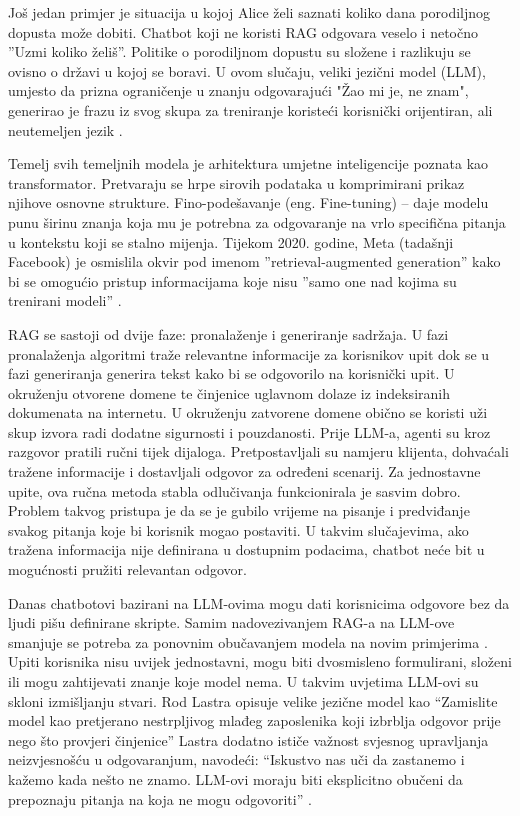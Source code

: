 \documentclass[]{foi}
\begin{document}
Još jedan primjer je situacija u kojoj Alice želi saznati koliko dana porodiljnog dopusta može dobiti. Chatbot koji ne koristi RAG odgovara veselo i netočno ”Uzmi koliko želiš”.
Politike o porodiljnom dopustu su složene i razlikuju se ovisno o državi u kojoj se boravi. U ovom slučaju, veliki jezični model (LLM), umjesto da prizna ograničenje u znanju odgovarajući
"Žao mi je, ne znam", generirao je frazu iz svog skupa za treniranje koristeći korisnički orijentiran, ali neutemeljen jezik \cite{ibmRAG}.

Temelj svih temeljnih modela je arhitektura umjetne inteligencije poznata kao transformator. Pretvaraju se hrpe sirovih podataka u komprimirani prikaz njihove osnovne strukture. 
Fino-podešavanje (eng. Fine-tuning) – daje modelu punu širinu znanja koja mu je potrebna za odgovaranje na vrlo specifična pitanja u kontekstu koji se stalno mijenja. Tijekom 2020. godine, 
Meta (tadašnji Facebook) je osmislila okvir pod imenom ”retrieval-augmented generation” kako bi se omogućio pristup informacijama koje nisu ”samo one nad kojima su trenirani modeli” \cite{ibmRAG}.

RAG se sastoji od dvije faze: pronalaženje i generiranje sadržaja. U fazi pronalaženja algoritmi traže relevantne informacije za korisnikov upit dok se u fazi generiranja generira tekst 
kako bi se odgovorilo na korisnički upit. U okruženju otvorene domene te činjenice uglavnom dolaze iz indeksiranih dokumenata na internetu. U okruženju zatvorene domene obično se koristi 
uži skup izvora radi dodatne sigurnosti i pouzdanosti. Prije LLM-a, agenti su kroz razgovor pratili ručni tijek dijaloga. Pretpostavljali su namjeru klijenta, dohvaćali tražene informacije 
i dostavljali odgovor za određeni scenarij. Za jednostavne upite, ova ručna metoda stabla odlučivanja funkcionirala je sasvim dobro. Problem takvog pristupa je da se je gubilo vrijeme na 
pisanje i predviđanje svakog pitanja koje bi korisnik mogao postaviti. U takvim slučajevima, ako tražena informacija nije definirana u dostupnim podacima, chatbot neće bit u mogućnosti 
pružiti relevantan odgovor\cite{ibmRAG}. 

Danas chatbotovi bazirani na LLM-ovima mogu dati korisnicima odgovore bez da ljudi pišu definirane skripte. Samim nadovezivanjem RAG-a na LLM-ove smanjuje se potreba za ponovnim obučavanjem 
modela na novim primjerima \cite{ibmRAG}. Upiti korisnika nisu uvijek jednostavni, mogu biti dvosmisleno formulirani, složeni ili mogu zahtijevati znanje koje model nema. U takvim uvjetima 
LLM-ovi su skloni izmišljanju stvari. Rod Lastra opisuje velike jezične model kao “Zamislite model kao pretjerano nestrpljivog mlađeg zaposlenika koji izbrblja odgovor prije nego što provjeri činjenice”
Lastra dodatno ističe važnost svjesnog upravljanja neizvjesnošću u odgovaranjum, navodeći: “Iskustvo nas uči da zastanemo i kažemo kada nešto ne znamo. LLM-ovi moraju biti eksplicitno obučeni da prepoznaju pitanja na koja ne mogu odgovoriti” \cite{ibmRAG}. 
\end{document}
